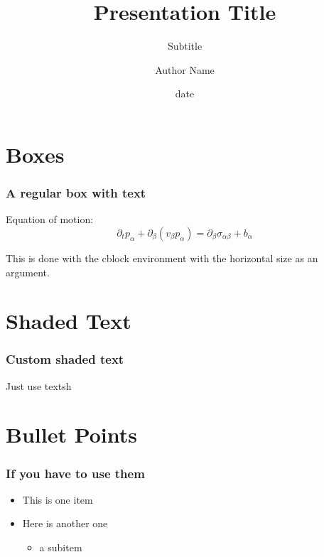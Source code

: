 \documentclass{beamer}
\title{Presentation Title}
\subtitle{Subtitle}
\author{Author Name}
\institute{Institute}
\date{date}
\begin{document}
\titleframe
 \section{Boxes}
\begin{frame}
  \frametitle{A regular box with text}
  \begin{cblock}{6cm}
    Equation of motion:
    \begin{equation*}
      \partial_t p_\alpha + \partial_\beta (v_\beta p_\alpha) = \partial_\beta \sigma_{\alpha \beta} + b_\alpha
    \end{equation*}
    \vspace{-2em}
  \end{cblock}
This is done with the cblock environment with the horizontal size as an argument.
\end{frame}
\section{Shaded Text}
\begin{frame}
    \frametitle{Custom shaded text}

    Just use textsh
\end{frame}


\section{Bullet Points}
\begin{frame}
  \frametitle{If you have to use them}
  \begin{itemize}
    \item This is one item
    \item Here is another one
      \begin{itemize}
        \item a subitem
      \end{itemize}
  \end{itemize}
\end{frame}
\end{document}
